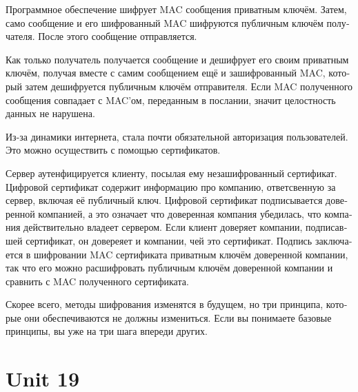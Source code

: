 \documentclass[a5paper,10pt,notitlepage,pdftex,headsepline]{scrartcl}
\begin{document}
\begin{otherlanguage}{russian}
      Программное обеспечение шифрует MAC сообщения приватным ключём.
      Затем, само сообщение и его шифрованный MAC шифруются публичным ключём
      получателя.
      После этого сообщение отправляется.

      Как только получатель получается сообщение и дешифрует его своим
      приватным ключём, получая вместе с самим сообщением ещё и
      зашифрованный MAC, который затем дешифруется публичным ключём
      отправителя.
      Если MAC полученного сообщения совпадает с MAC'ом, переданным в
      послании, значит целостность данных не нарушена.

      Из-за динамики интернета, стала почти обязательной авторизация
      пользователей.
      Это можно осуществить с помощью сертификатов.

      Сервер аутенфицируется клиенту, посылая ему незашифрованный
      сертификат.
      Цифровой сертификат содержит информацию про компанию, ответсвенную за
      сервер, включая её публичный ключ.
      Цифровой сертификат подписывается доверенной компанией, а это означает
      что доверенная компания убедилась, что компания действительно владеет
      сервером.
      Если клиент доверяет компании, подписавшей сертификат, он довереяет и
      компании, чей это сертификат.
      Подпись заключается в шифровании MAC сертификата приватным ключём
      доверенной компании, так что его можно расшифровать публичным ключём
      доверенной компании и сравнить с MAC полученного сертификата.

      Скорее всего, методы шифрования изменятся в будущем, но три принципа,
      которые они обеспечиваются не должны измениться.
      Если вы понимаете базовые принципы, вы уже на три шага впереди других.
    \end{otherlanguage}
\section{Unit 19}
\end{document}
